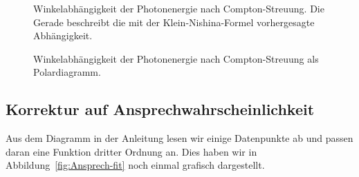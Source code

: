 \documentclass[11pt, ngerman, fleqn, DIV=15, headinclude, BCOR=2cm]{scrreprt}
\begin{document}
\begin{figure}[htbp]
    \centering
    \caption{%
        Winkelabhängigkeit der Photonenergie nach Compton-Streuung. Die
        Gerade beschreibt die mit der Klein-Nishina-Formel vorhergesagte
        Abhängigkeit.
    }
    \label{fig:E_winkelabhaengigkeit}
\end{figure}

\begin{figure}[htbp]
    \centering
    \caption{%
        Winkelabhängigkeit der Photonenergie nach Compton-Streuung als
        Polardiagramm.
    }
    \label{fig:nishina-ex}
\end{figure}

\subsection{Korrektur auf Ansprechwahrscheinlichkeit}


Aus dem Diagramm in der Anleitung
\parencite[Abbildung~P526.3]{physik512-Anleitung} lesen wir einige Datenpunkte
ab und passen daran eine Funktion dritter Ordnung an. Dies haben wir in
Abbildung~\ref{fig:Ansprech-fit} noch einmal grafisch dargestellt.
\end{document}

